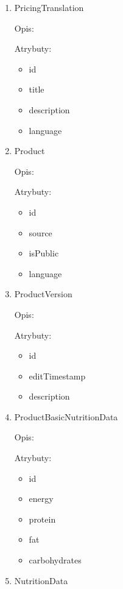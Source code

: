 \begin{enumerate}[label={\textbf{KAT/\protect\threedigits{\theenumi}}}, wide, labelwidth=!, labelindent=0pt]
    \item \label{kat:PricingTranslation} PricingTranslation

    Opis: \lipsum[1]
    \par
    Atrybuty:
    \begin{itemize}
        \item id
        \item title
        \item description
        \item language
    \end{itemize}

    \item \label{kat:Product} Product

    Opis: \lipsum[1]
    \par
    Atrybuty:
    \begin{itemize}
        \item id
        \item source
        \item isPublic
        \item language
    \end{itemize}

    \item \label{kat:ProductVersion} ProductVersion

    Opis: \lipsum[1]
    \par
    Atrybuty:
    \begin{itemize}
        \item id
        \item editTimestamp
        \item description
    \end{itemize}

    \item \label{kat:ProductBasicNutritionData} ProductBasicNutritionData

    Opis: \lipsum[1]
    \par
    Atrybuty:
    \begin{itemize}
        \item id
        \item energy
        \item protein
        \item fat
        \item carbohydrates
    \end{itemize}

    \item \label{kat:NutritionData} NutritionData


\end{enumerate}
